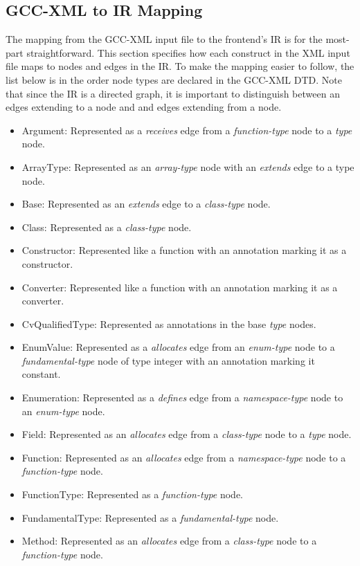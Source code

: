 \documentclass[12pt]{article}
\begin{document}
\subsection{GCC-XML to IR Mapping}
The mapping from the GCC-XML input file to the frontend's IR is for the most-part straightforward. This section specifies how each construct in the XML input file maps to nodes and edges in the IR. To make the mapping easier to follow, the list below is in the order node types are declared in the GCC-XML DTD. Note that since the IR is a directed graph, it is important to distinguish between an edges extending to a node and and edges extending from a node. 

\begin{itemize}
\item Argument: Represented as a \emph{receives} edge from a \emph{function-type} node to a \emph{type} node. 
\item ArrayType: Represented as an \emph{array-type} node with an \emph{extends} edge to a type node.
\item Base: Represented as an \emph{extends} edge to a \emph{class-type} node. 
\item Class: Represented as a \emph{class-type} node.
\item Constructor: Represented like a function with an annotation marking it as a constructor.
\item Converter: Represented like a function with an annotation marking it as a converter.
\item CvQualifiedType: Represented as annotations in the base \emph{type} nodes. 
\item EnumValue: Represented as a \emph{allocates} edge from an \emph{enum-type} node to a \emph{fundamental-type} node of type integer with an annotation marking it constant.
\item Enumeration: Represented as a \emph{defines} edge from a \emph{namespace-type} node to an \emph{enum-type} node.
\item Field: Represented as an \emph{allocates} edge from a \emph{class-type} node to a \emph{type} node. 
\item Function: Represented as an \emph{allocates} edge from a \emph{namespace-type} node to a \emph{function-type} node.
\item FunctionType: Represented as a \emph{function-type} node.
\item FundamentalType: Represented as a \emph{fundamental-type} node.
\item Method: Represented as an \emph{allocates} edge from a \emph{class-type} node to a \emph{function-type} node.

\end{itemize}
\end{document}
